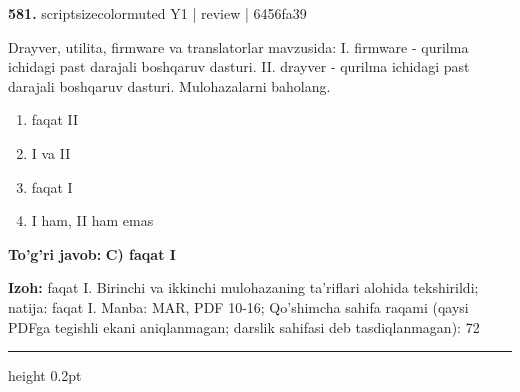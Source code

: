 \documentclass[10pt,a4paper]{article}
\begin{document}
{\bfseries\sffamily\color{ink} 581.} {scriptsizecolor{muted} Y1 | review | 6456fa39}
\par
Drayver, utilita, firmware va translatorlar mavzusida: I. firmware - qurilma ichidagi past darajali boshqaruv dasturi. II. drayver - qurilma ichidagi past darajali boshqaruv dasturi. Mulohazalarni baholang.
\begin{enumerate}[label=\Alph*),leftmargin=9mm]
\item faqat II
\item I va II
\item faqat I
\item I ham, II ham emas
\end{enumerate}
\begin{tcolorbox}[enhanced,breakable,colback=teal!4,colframe=teal!60!black,boxrule=0.45pt,arc=1.2mm,left=2.7mm,right=2.7mm,top=1.8mm,bottom=1.8mm,before skip=2mm,after skip=2mm]
{\bfseries\sffamily\color{teal}To'g'ri javob:} \textbf{C) faqat I}
\par\smallskip
{\bfseries Izoh:} faqat I. Birinchi va ikkinchi mulohazaning ta'riflari alohida tekshirildi; natija: faqat I. Manba: MAR, PDF 10-16; Qo'shimcha sahifa raqami (qaysi PDFga tegishli ekani aniqlanmagan; darslik sahifasi deb tasdiqlanmagan): 72
\end{tcolorbox}
\vspace{2mm}\hrule height 0.2pt\vspace{3mm}
\end{document}
